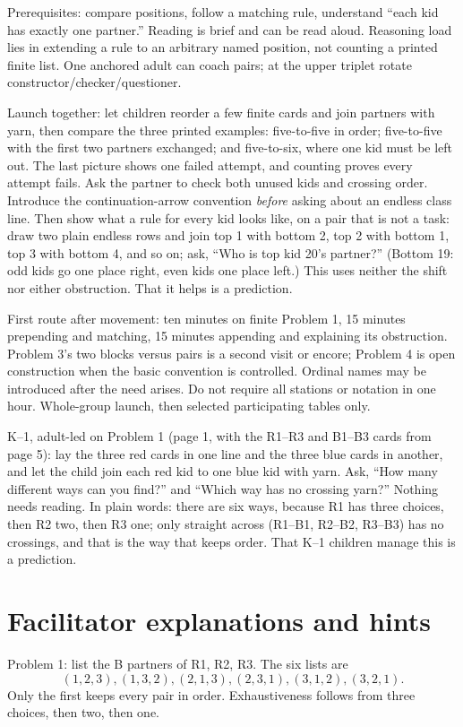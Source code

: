 \documentclass[11pt,letterpaper]{article}
\begin{document}
Prerequisites: compare positions, follow a matching rule, understand ``each kid has exactly one partner.'' Reading is brief and can be read aloud. Reasoning load lies in extending a rule to an arbitrary named position, not counting a printed finite list. One anchored adult can coach pairs; at the upper triplet rotate constructor/checker/questioner.

Launch together: let children reorder a few finite cards and join partners with yarn, then compare the three printed examples: five-to-five in order; five-to-five with the first two partners exchanged; and five-to-six, where one kid must be left out. The last picture shows one failed attempt, and counting proves every attempt fails. Ask the partner to check both unused kids and crossing order. Introduce the continuation-arrow convention \emph{before} asking about an endless class line. Then show what a rule for every kid looks like, on a pair that is not a task: draw two plain endless rows and join top 1 with bottom 2, top 2 with bottom 1, top 3 with bottom 4, and so on; ask, ``Who is top kid 20's partner?'' (Bottom 19: odd kids go one place right, even kids one place left.) This uses neither the shift nor either obstruction. That it helps is a prediction.

First route after movement: ten minutes on finite Problem 1, 15 minutes prepending and matching, 15 minutes appending and explaining its obstruction. Problem 3's two blocks versus pairs is a second visit or encore; Problem 4 is open construction when the basic convention is controlled. Ordinal names may be introduced after the need arises. Do not require all stations or notation in one hour. Whole-group launch, then selected participating tables only.

K--1, adult-led on Problem 1 (page 1, with the R1--R3 and B1--B3 cards from page 5): lay the three red cards in one line and the three blue cards in another, and let the child join each red kid to one blue kid with yarn. Ask, ``How many different ways can you find?'' and ``Which way has no crossing yarn?'' Nothing needs reading. In plain words: there are six ways, because R1 has three choices, then R2 two, then R3 one; only straight across (R1--B1, R2--B2, R3--B3) has no crossings, and that is the way that keeps order. That K--1 children manage this is a prediction.
\newpage
\section*{Facilitator explanations and hints}
Problem 1: list the B partners of R1, R2, R3. The six lists are\[ (1,2,3),(1,3,2),(2,1,3),(2,3,1),(3,1,2),(3,2,1). \] Only the first keeps every pair in order. Exhaustiveness follows from three choices, then two, then one.
\end{document}

